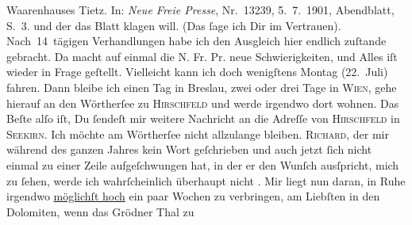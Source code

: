 \begin{ledgroupsized}[t]{13cm}
{{{{                        Waarenhauses Tietz}. In: \emph{Neue Freie
                        Presse}, Nr. 13239, 5. 7. 1901,
                     Abendblatt, S. 3.}}}\label{K_L03073-1h} und der das Blatt klagen will. (Das ſage ich Dir im Vertrauen).
               Nach 14 tägigen Verhandlungen habe ich den Ausgleich hier endlich zuſtande gebracht.
               Da macht auf einmal die N. Fr. Pr. neue
               Schwierigkeiten, und Alles iſt {\pb}wieder in Frage
               geſtellt.\pend
           \pstart
           Vielleicht kann ich doch wenigſtens Montag (22. Juli)
               fahren. Dann bleibe ich einen Tag in Breslau,
               zwei oder drei Tage in \textsc{Wien}, gehe hierauf an den Wörtherſee zu \textsc{Hirschfeld} und werde irgendwo dort wohnen. Das Beſte alſo iſt, Du ſendeſt mir weitere
               Nachricht an die Adreſſe von \textsc{Hirschfeld} in \textsc{Seekirn}. Ich möchte am Wörtherſee nicht allzulange
               bleiben. \textsc{Richard}, der mir während des ganzen Jahres kein Wort geſchrieben und auch jetzt ſich
               nicht einmal zu einer Zeile {\pb}aufgeſchwungen hat, in
               der er den Wunſch ausſpricht, mich zu ſehen, werde ich wahrſcheinlich überhaupt nicht
                  \label{K_L03073-43v}\label{K_L03073-43h}.\pend
           \pstart
           Mir liegt nun daran, in Ruhe irgendwo \uline{möglichſt hoch}
               ein paar Wochen zu verbringen, am Liebſten in den Dolomiten, wenn das Grödner Thal zu

\end{ledgroupsized}
